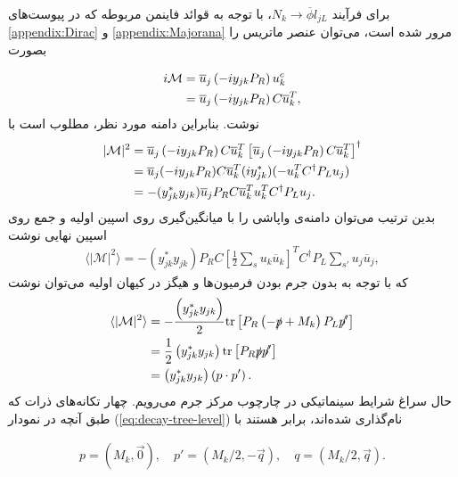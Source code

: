 \documentclass[a4paper]{book}
\begin{document}
برای فرآیند {\footnotesize$N_k \to \overline{\phi} l_{jL}$}، با توجه به قوائد فاینمن مربوطه که در پیوست‌های \ref{appendix:Dirac} و \ref{appendix:Majorana} مرور شده است، می‌توان عنصر ماتریس را بصورت
\par
\vspace{-0.5cm}
{\footnotesize\begin{align}
	i\mathcal{M}&=\overline{u}_j \left(-i y_{jk} P_R\right) u^c_k \notag \\
	&=\overline{u}_j \left(-i y_{jk} P_R\right) C \overline{u}^T_k,
	\label{eq:tree-level-M}
\end{align}}
نوشت. بنابراین دامنه مورد نظر، مطلوب است با
{\footnotesize\begin{align}
	|\mathcal{M}|^2&=\overline{u}_j \left(-i y_{jk} P_R\right) C \overline{u}^T_k \left[\overline{u}_j \left(-i y_{jk} P_R\right) C \overline{u}^T_k\right]^{\dagger} \notag\\
	&=\overline{u}_j (-i y_{jk} P_R) C \overline{u}^T_k (i y^*_{jk})(-u_k^T C^{\dagger}P_L u_j)\notag\\
	&=-(y^*_{jk} y_{jk}) \overline{u}_j P_R C \overline{u}_k^T u_k^T C^{\dagger} P_L u_j.
\end{align}}
بدین ترتیب می‌توان دامنه‌ی واپاشی را با میانگین‌گیری روی اسپین اولیه و جمع روی اسپین نهایی نوشت
{\footnotesize\begin{align}
	\langle|\mathcal{M}|^2\rangle=-\left(y^*_{jk} y_{jk}\right) P_R C \left[\frac{1}{2}\sum_{s}u_k \overline{u}_k\right]^T C^{\dagger} P_L \sum_{s'} u_j \overline{u}_j,
\end{align}}
که با توجه به بدون جرم بودن فرمیون‌ها و هیگز در کیهان اولیه می‌توان نوشت
{\footnotesize\begin{align}
	\langle|\mathcal{M}|^2\rangle&=-\frac{\left(y^*_{jk} y_{jk}\right)}{2} {\rm tr} \left[P_R\left(-\slashed{p}+M_k\right)P_L \slashed{p'}\right]\notag\\
	&=\frac{1}{2} \left(y^*_{jk} y_{jk}\right) {\rm tr}\left[P_R \slashed{p} \slashed{p'}\right]\notag\\
	&=\left(y^*_{jk} y_{jk}\right)\left(p \cdot p'\right).
	\label{eq:avraged-amplitude-lepton}
\end{align}}
حال سراغ شرایط سینماتیکی در چارچوب مرکز جرم می‌رویم. چهار تکانه‌های ذرات که طبق آنچه در نمودار (\ref{eq:decay-tree-level}) نام‌گذاری شده‌اند، برابر هستند با
\par
\vspace{-0.5cm}
{\footnotesize\begin{align}
	p=(M_k,\vec{0}), \quad p'=(M_k/2, -\vec{q}),\quad q=(M_k/2,\vec{q}).
	\label{eq:kinematic}
\end{align}}
\end{document}
